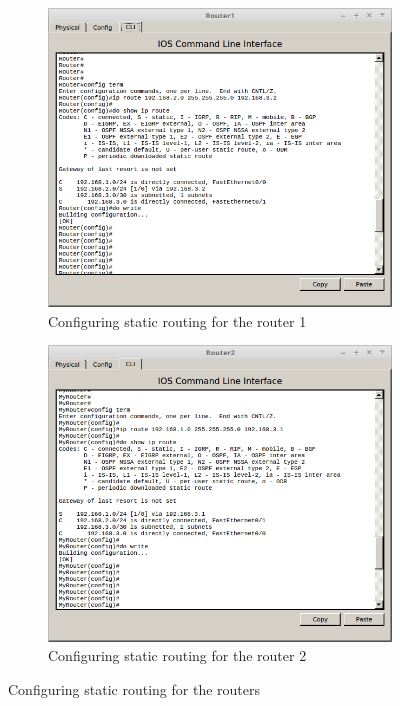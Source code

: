 \documentclass{article}
\begin{document}
\begin{figure}[h]
\begin{subfigure}{0.5\textwidth}
    \includegraphics[width=\linewidth]{3routersconf1}
    \caption{Configuring static routing for the router 1}
    \label{fig:3routersconf1}
\end{subfigure}
%
\begin{subfigure}{0.5\textwidth}
    \includegraphics[width=\linewidth]{3routersconf2}
    \caption{Configuring static routing for the router 2}
    \label{fig:3routersconf2}
\end{subfigure}

 \caption{Configuring static routing for the routers}
    \label{fig:3routersconf}
\end{figure}
\end{document}
